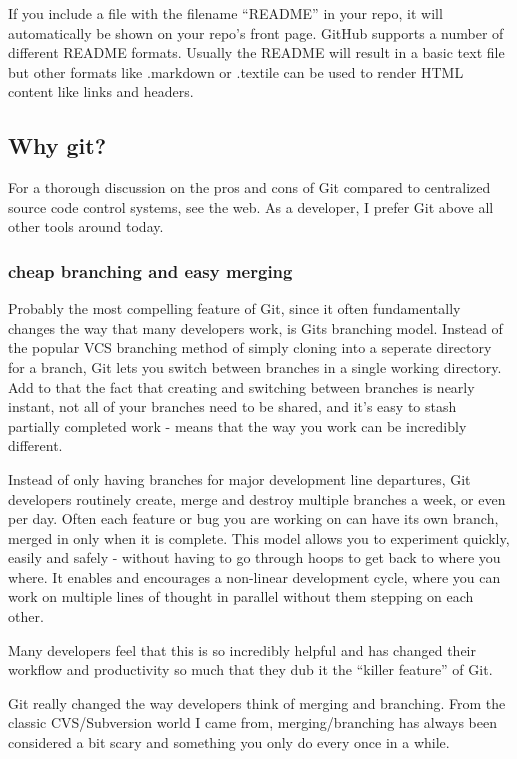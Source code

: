 If you include a file with the filename “README” in your repo, it will
automatically be shown on your repo’s front page. GitHub supports a number of
different README formats. Usually the README will result in a basic text
file but other formats like .markdown or .textile can be used to render HTML
content like links and headers.

\subsection{Why git?}
For a thorough discussion on the pros and cons of Git compared to centralized
source code control systems, see the web. As a developer, I prefer Git above all
other tools around today.

\subsubsection{cheap branching and easy merging}
Probably the most compelling feature of Git, since it often fundamentally changes
the way that many developers work, is Gits branching model. Instead of the
popular VCS branching method of simply cloning into a seperate directory for a
branch, Git lets you switch between branches in a single working directory. Add
to that the fact that creating and switching between branches is nearly instant,
not all of your branches need to be shared, and it’s easy to stash partially
completed work - means that the way you work can be incredibly different.

Instead of only having branches for major development line departures, Git
developers routinely create, merge and destroy multiple branches a week, or even
per day. Often each feature or bug you are working on can have its own branch,
merged in only when it is complete. This model allows you to experiment quickly,
easily and safely - without having to go through hoops to get back to where you
where. It enables and encourages a non-linear development cycle, where you can
work on multiple lines of thought in parallel without them stepping on each
other.

Many developers feel that this is so incredibly helpful and has changed their
workflow and productivity so much that they dub it the “killer feature” of Git.

Git really changed the way developers think of merging
and branching. From the classic CVS/Subversion world I came from,
merging/branching has always been considered a bit scary and something you only
do every once in a while.

